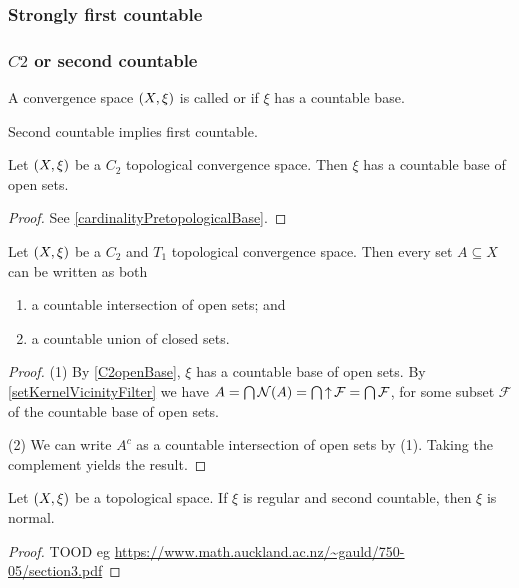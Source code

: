 \subsubsection{Strongly first countable}

\subsubsection{$C2$ or second countable}
\begin{definition}
A convergence space $\left( X, \xi \right)$ is called  or  if $\xi$ has a countable base.
\end{definition}

\begin{lemma}
Second countable implies first countable.
\end{lemma}

\begin{lemma} \label{C2openBase}
Let $\left( X,\xi \right)$ be a $C_2$ topological convergence space. Then $\xi$ has a countable base of open sets.
\end{lemma}
\begin{proof}
See \ref{cardinalityPretopologicalBase}.
\end{proof}

\begin{lemma} \label{AnySetCountableIntersectionOfOpenSets}
Let $\left( X,\xi \right)$ be a $C_2$ and $T_1$ topological convergence space. Then every set $A\subseteq X$ can be written as both
\begin{enumerate}
\item a countable intersection of open sets; and
\item a countable union of closed sets.
\end{enumerate}
\end{lemma}
\begin{proof}
(1) By \ref{C2openBase}, $\xi$ has a countable base of open sets. By \ref{setKernelVicinityFilter} we have $A = \bigcap \operatorname{\mathcal{N}}(A) = \bigcap \operatorname{\uparrow} \mathcal{F} = \bigcap \mathcal{F}$, for some subset $\mathcal{F}$ of the countable base of open sets.

(2) We can write $A^c$ as a countable intersection of open sets by (1). Taking the complement yields the result.
\end{proof}


\begin{proposition} \label{countableRegularityImpliesNormality}
Let $\left( X,\xi \right)$ be a topological space. If $\xi$ is regular and second countable, then $\xi$ is normal.
\end{proposition}
\begin{proof}
TOOD eg \url{https://www.math.auckland.ac.nz/~gauld/750-05/section3.pdf}
\end{proof}


